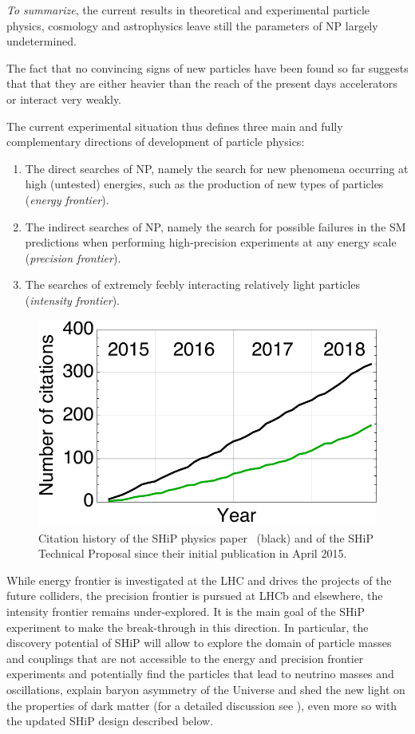 \emph{To summarize}, the current results in theoretical and experimental particle physics, cosmology and  astrophysics leave still the parameters of NP largely undetermined.

The fact that no convincing signs of new particles have been found so far suggests that that they are either heavier than the reach of the present days accelerators or interact very weakly.

The current experimental situation thus defines three main and fully complementary directions of development of particle physics:
\begin{enumerate}
    \item  The  direct searches of NP, namely the search for new phenomena occurring at high (untested) energies, such as the production of new types of particles (\emph{energy frontier}).
    \item  The indirect searches of NP, namely the search for possible failures in the SM predictions when performing high-precision experiments at any energy scale (\emph{precision frontier}).
\item The searches of extremely feebly interacting relatively light particles (\emph{intensity frontier}).
\end{enumerate}

\begin{figure}[!t]
    \centering
    \includegraphics{figs/Introduction/citations_PP_TP.pdf}
    \caption{Citation history of the SHiP physics paper~\protect\cite{Alekhin:2015byh} (black) and of the SHiP Technical Proposal \protect\cite{Anelli:2015pba} since their initial publication in April 2015.}
    \label{fig:citations}
\end{figure}

While energy frontier is investigated at the LHC and drives the projects of the future colliders, the precision frontier is pursued at LHCb and elsewhere, the intensity frontier remains under-explored. It is the main goal of the SHiP experiment to make the break-through in this direction. In particular, the discovery potential of SHiP will allow to  explore the domain of  particle masses and couplings that are not accessible to the energy and precision frontier experiments and potentially find the particles that lead to neutrino masses and oscillations, explain  baryon asymmetry of the Universe and  shed the new light on the properties of dark matter (for a detailed discussion see \cite{Alekhin:2015byh}), even more so with the updated SHiP design described below.

